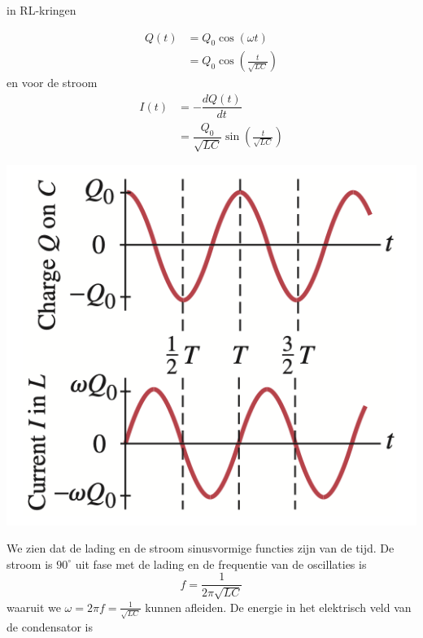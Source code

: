 \begin{app}[LC-kringen]{in RL-kringen}
    \begin{minipage}{.71\textwidth}
        \begin{align*}
            Q(t) &= Q_{0}\cos(\omega t) \\
                 &= Q_{0}\cos(\tfrac{t}{\sqrt{LC}})
        \end{align*}
        \hspace{-0.6cm} en voor de stroom
        \begin{align*}
            I(t) &= -\dfrac{dQ(t)}{dt} \\
                 &= \dfrac{Q_{0}}{\sqrt{LC}}\sin(\tfrac{t}{\sqrt{LC}})
        \end{align*}
    \end{minipage}
    \begin{minipage}{.25\textwidth}
        \vspace{0.3cm}\hspace{-0.45cm}\includegraphics[scale = 0.45]{Images/Magnetisme/LCKringGrafiek}
    \end{minipage}
    We zien dat de lading en de stroom sinusvormige functies zijn van de tijd. De stroom is $90^{\circ}$ uit fase met de lading en de frequentie van de oscillaties is
    \begin{equation*}
        f = \dfrac{1}{2\pi\sqrt{LC}}
    \end{equation*}
    waaruit we $\omega = 2\pi f = \tfrac{1}{\sqrt{LC}}$ kunnen afleiden. De energie in het elektrisch veld van de condensator is


\end{app}
